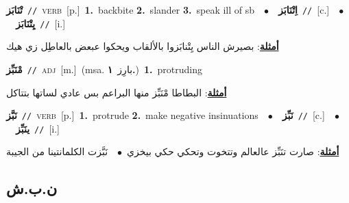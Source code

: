 \documentclass[10pt,a4paper,twoside]{article} %
\begin{document}
\begin{multicols}{2}
{\setlength\topsep{0pt}\textbf{\foreignlanguage{arabic}{تْنَابَز}}\ {\color{gray}\texttt{//}\color{black}}\ \textsc{verb}\ [p.]\ \textbf{1.}~backbite  \textbf{2.}~slander  \textbf{3.}~speak ill of sb\ \ $\bullet$\ \ \setlength\topsep{0pt}\textbf{\foreignlanguage{arabic}{اِتْنَابَز}}\ {\color{gray}\texttt{//}\color{black}}\ [c.]\ \ $\bullet$\ \ \setlength\topsep{0pt}\textbf{\foreignlanguage{arabic}{يِتْنَابَز}}\ {\color{gray}\texttt{//}\color{black}}\ [i.]\  \begin{flushright}\color{gray}\foreignlanguage{arabic}{\textbf{\underline{\foreignlanguage{arabic}{أمثلة}}}: بصيرش الناس يِتْنابَزوا بالألقاب ويحكوا عبعض بالعاطِل زي هيك}\end{flushright}\color{black}} \vspace{2mm}

{\setlength\topsep{0pt}\textbf{\foreignlanguage{arabic}{مْنَبِّز}}\ {\color{gray}\texttt{//}\color{black}}\ \textsc{adj}\ [m.]\ \color{gray}(msa. \foreignlanguage{arabic}{بارِز}~\foreignlanguage{arabic}{\textbf{١.}})\color{black}\ \textbf{1.}~protruding\  \begin{flushright}\color{gray}\foreignlanguage{arabic}{\textbf{\underline{\foreignlanguage{arabic}{أمثلة}}}: البطاطا مْنَبِّز منها البراعم بس عادي لساتها بتتاكل}\end{flushright}\color{black}} \vspace{2mm}

{\setlength\topsep{0pt}\textbf{\foreignlanguage{arabic}{نَبَّز}}\ {\color{gray}\texttt{//}\color{black}}\ \textsc{verb}\ [p.]\ \textbf{1.}~protrude  \textbf{2.}~make negative insinuations\ \ $\bullet$\ \ \setlength\topsep{0pt}\textbf{\foreignlanguage{arabic}{نَبِّز}}\ {\color{gray}\texttt{//}\color{black}}\ [c.]\ \ $\bullet$\ \ \setlength\topsep{0pt}\textbf{\foreignlanguage{arabic}{ينَبِّز}}\ {\color{gray}\texttt{//}\color{black}}\ [i.]\  \begin{flushright}\color{gray}\foreignlanguage{arabic}{\textbf{\underline{\foreignlanguage{arabic}{أمثلة}}}: صارت تنَبِّز عالعالم وتتخوت وتحكي حكي بيخزي\ $\bullet$\ \  نَبَّزت الكلمانتينا من الجيبة}\end{flushright}\color{black}} \vspace{2mm}

\vspace{-3mm}
\subsection*{\color{blue}\foreignlanguage{arabic}{ن.ب.ش}\color{blue}{}} 


\end{multicols}
\end{document}
